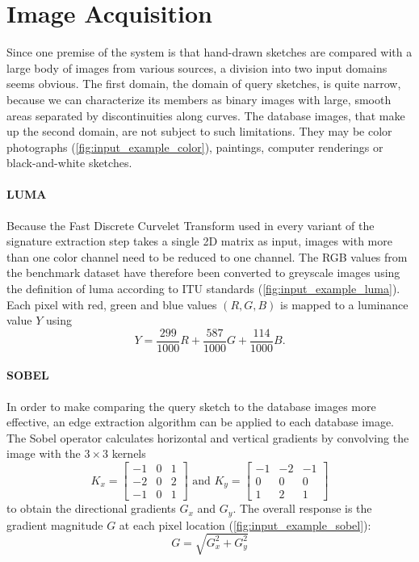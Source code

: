 \section{Image Acquisition}

Since one premise of the system is that hand-drawn sketches are compared with a
large body of images from various sources, a division into two input domains
seems obvious. The first domain, the domain of query sketches, is quite narrow,
because we can characterize its members as binary images with large, smooth
areas separated by discontinuities along curves. The database images, that make
up the second domain, are not subject to such limitations. They may be color
photographs (\autoref{fig:input_example_color}), paintings, computer renderings
or black-and-white sketches.

\paragraph{LUMA}

Because the Fast Discrete Curvelet Transform used in every variant of the
signature extraction step takes a single 2D matrix as input, images with more
than one color channel need to be reduced to one channel. The RGB values from
the benchmark dataset have therefore been converted to greyscale images using
the definition of luma according to ITU standards \autocite{_parameter_2002}
(\autoref{fig:input_example_luma}).  Each pixel with red, green and blue values
$(R, G, B)$ is mapped to a luminance value $Y$ using
\begin{equation*}
    Y = \frac{299}{1000}R + \frac{587}{1000}G + \frac{114}{1000}B.
\end{equation*}

\paragraph{SOBEL}

In order to make comparing the query sketch to the database images more
effective, an edge extraction algorithm can be applied to each database image.
The Sobel operator calculates horizontal and vertical gradients by convolving
the image with the $3 \times 3$ kernels
\begin{equation*}
    K_x =
    \begin{bmatrix}
        -1 & 0 & 1 \\
        -2 & 0 & 2 \\
        -1 & 0 & 1
    \end{bmatrix}
    \text{ and }
    K_y =
    \begin{bmatrix}
        -1 & -2 & -1 \\
         0 &  0 &  0 \\
         1 &  2 &  1
    \end{bmatrix}
\end{equation*}
to obtain the directional gradients $G_x$ and $G_y$. The overall response is
the gradient magnitude $G$ at each pixel location
(\autoref{fig:input_example_sobel}):
\begin{equation*}
    G = \sqrt{G_x^2 + G_y^2}
\end{equation*}

